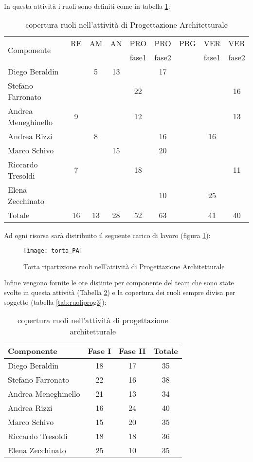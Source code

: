 In questa attività i ruoli sono definiti come in tabella \ref{tab:ruoliprog}:

\begin{table}[h]
\centering
\begin{tabular}{|l|c|c|c|c|c|c|c|c|}
\hline
\multirow{2}{*}{Componente}& RE& AM& AN& PRO& PRO& PRG& VER& VER\\
                    &    &      &      &fase1          &fase2         &        &fase1	 &fase2\\ 
\hline
Diego Beraldin & & 5& 13& & 17& & &\\
Stefano Farronato & & & & 22& & & & 16\\
Andrea Meneghinello & 9& & & 12& & & & 13\\
Andrea Rizzi & & 8& & & 16& & 16& \\
Marco Schivo & & & 15& & 20& & & \\
Riccardo Tresoldi & 7& & & 18& & & & 11\\
Elena Zecchinato & & & & & 10& & 25& \\
\hline
Totale & 16& 13& 28& 52& 63& & 41& 40\\
\hline
\end{tabular}
\caption{copertura ruoli nell'attività di Progettazione Architetturale}\label{tab:ruoliprog}
\end{table}
\clearpage

Ad ogni risorsa sarà distribuito il seguente carico di lavoro (figura \ref{fig:ruoliprog}):
\begin{figure}[h!]
\centering
\texttt{[image: torta\_PA]}
\caption{Torta ripartizione ruoli nell'attività di Progettazione Architetturale}\label{fig:ruoliprog}
\end{figure}

Infine vengono fornite le ore distinte per componente del team che sono state svolte in questa attività (Tabella \ref{tab:ruoliprog2}) e la copertura dei ruoli sempre divisa per soggetto (tabella \ref{tab:ruoliprog3}):

\begin{table}[h!]
\centering
\begin{tabular}{|l|c|c|c|}
\hline
Componente& Fase I& Fase II& Totale\\
\hline
Diego Beraldin &18 &17 & 35\\
Stefano Farronato & 22& 16& 38\\
Andrea Meneghinello & 21& 13& 34\\
Andrea Rizzi & 16& 24& 40\\
Marco Schivo & 15& 20& 35\\
Riccardo Tresoldi & 18& 18& 36\\
Elena Zecchinato & 25& 10& 35\\
\hline
\end{tabular}
\caption{copertura ruoli nell'attività di progettazione architetturale}\label{tab:ruoliprog2}
\end{table}

